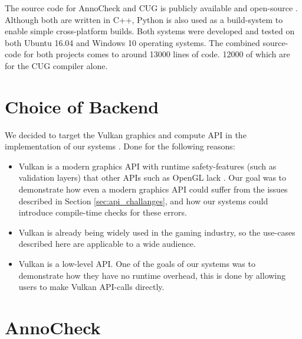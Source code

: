 \documentclass[a4paper,12pt,twoside,openright]{report}
\def\totalloccount{13000 }
\def\compilerloccount{12000 }
\begin{document}
The source code for AnnoCheck and CUG is publicly available and open-source
\cite{ProjectSource}. Although both are written in C++, Python is also used as
a build-system to enable simple cross-platform builds. Both systems were
developed and tested on both Ubuntu 16.04 and Windows 10 operating systems. The
combined source-code for both projects comes to around \totalloccount lines of
code. \compilerloccount of which are for the CUG compiler alone.


\section{Choice of Backend}

\label{sec:backend_choice}


We decided to target the Vulkan graphics and compute API in the implementation
of our systems \cite{Vulkan}. Done for the following reasons:

\begin{itemize}

    \item Vulkan is a modern graphics API with runtime safety-features (such as
    validation layers) that other APIs such as OpenGL lack \cite{TODO}. Our
    goal was to demonstrate how even a modern graphics API could suffer from
    the issues described in Section \ref{sec:api_challanges}, and how our
    systems could introduce compile-time checks for these errors.

    \item Vulkan is already being widely used in the gaming industry, so the
    use-cases described here are applicable to a wide audience.

    \item Vulkan is a low-level API. One of the goals of our systems was to
    demonstrate how they have no runtime overhead, this is done by allowing
    users to make Vulkan API-calls directly.

\end{itemize}

\section{AnnoCheck}
\end{document}
